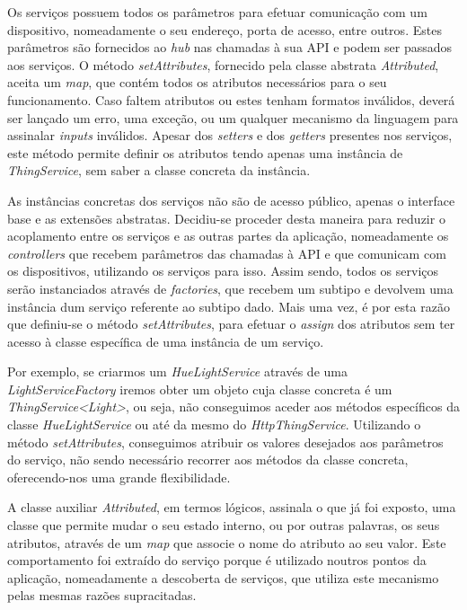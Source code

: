 Os serviços possuem todos os parâmetros para efetuar comunicação com um dispositivo, nomeadamente o seu endereço, porta de acesso, entre outros. Estes parâmetros são fornecidos ao \textit{hub} nas chamadas à sua API e podem ser passados aos serviços. O método \textit{setAttributes}, fornecido pela classe abstrata \textit{Attributed}, aceita um \textit{map}, que contém todos os atributos necessários para o seu funcionamento. Caso faltem atributos ou estes tenham formatos inválidos, deverá ser lançado um erro, uma exceção, ou um qualquer mecanismo da linguagem para assinalar \textit{inputs} inválidos. Apesar dos \textit{setters} e dos \textit{getters} presentes nos serviços, este método permite definir os atributos tendo apenas uma instância de \textit{ThingService}, sem saber a classe concreta da instância.

As instâncias concretas dos serviços não são de acesso público, apenas o interface base e as extensões abstratas. Decidiu-se proceder desta maneira para reduzir o acoplamento entre os serviços e as outras partes da aplicação, nomeadamente os \textit{controllers} que recebem parâmetros das chamadas à API e que comunicam com os dispositivos, utilizando os serviços para isso. Assim sendo, todos os serviços serão instanciados através de \textit{factories}, que recebem um subtipo e devolvem uma instância dum serviço referente ao subtipo dado. Mais uma vez, é por esta razão que definiu-se o método \textit{setAttributes}, para efetuar o \textit{assign} dos atributos sem ter acesso à classe específica de uma instância de um serviço.

Por exemplo, se criarmos um \textit{HueLightService} através de uma \textit{LightServiceFactory} iremos obter um objeto cuja classe concreta é um \textit{ThingService<Light>}, ou seja, não conseguimos aceder aos métodos específicos da classe \textit{HueLightService} ou até da mesmo do \textit{HttpThingService}. Utilizando o método \textit{setAttributes}, conseguimos atribuir os valores desejados aos parâmetros do serviço, não sendo necessário recorrer aos métodos da classe concreta, oferecendo-nos uma grande flexibilidade.

A classe auxiliar \textit{Attributed}, em termos lógicos, assinala o que já foi exposto, uma classe que permite mudar o seu estado interno, ou por outras palavras, os seus atributos, através de um \textit{map} que associe o nome do atributo ao seu valor. Este comportamento foi extraído do serviço porque é utilizado noutros pontos da aplicação, nomeadamente a descoberta de serviços, que utiliza este mecanismo pelas mesmas razões supracitadas.

